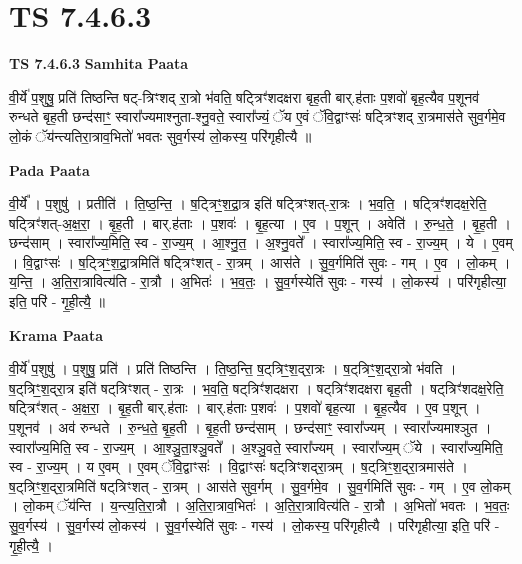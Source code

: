 \documentclass[17pt]{extarticle}
\begin{document}
\section{ TS 7.4.6.3 }

\textbf{TS 7.4.6.3 } \newline
\textbf{Samhita Paata} \newline

वी॒र्ये॑ प॒शुषु॒ प्रति॑ तिष्ठन्ति षट्-त्रिꣳशद् रा॒त्रो भ॑वति॒ षट्त्रिꣳ॑शदक्षरा बृह॒ती बार्.ह॑ताः प॒शवो॑ बृह॒त्यैव प॒शूनव॑ रुन्धते बृह॒ती छन्द॑साꣳ॒॒ स्वारा᳚ज्यमाश्नुता-श्नु॒वते॒ स्वारा᳚ज्यं॒ ॅय ए॒वं ॅवि॒द्वाꣳसः॑ षट्त्रिꣳशद् रा॒त्रमास॑ते सुव॒र्गमे॒व लो॒कं ॅय॑न्त्यतिरा॒त्राव॒भितो॑ भवतः सुव॒र्गस्य॑ लो॒कस्य॒ परि॑गृहीत्यै ॥ \newline

\textbf{Pada Paata} \newline

वी॒र्ये᳚ । प॒शुषु॑ । प्रतीति॑ । ति॒ष्ठ॒न्ति॒ । ष॒ट्त्रिꣳ॒॒श॒द्रा॒त्र इति॑ षट्त्रिꣳशत्-रा॒त्रः । भ॒व॒ति॒ । षट्त्रिꣳ॑शदक्ष॒रेति॒ षट्त्रिꣳ॑शत्-अ॒क्ष॒रा॒ । बृ॒ह॒ती । बार्.ह॑ताः । प॒शवः॑ । बृ॒ह॒त्या । ए॒व । प॒शून् । अवेति॑ । रु॒न्ध॒ते॒ । बृ॒ह॒ती । छन्द॑साम् । स्वारा᳚ज्य॒मिति॒ स्व - रा॒ज्य॒म् । आ॒श्नु॒त॒ । अ॒श्नु॒वते᳚ । स्वारा᳚ज्य॒मिति॒ स्व - रा॒ज्य॒म् । ये । ए॒वम् । वि॒द्वाꣳसः॑ । ष॒ट्त्रिꣳ॒॒श॒द्रा॒त्रमिति॑ षट्त्रिꣳशत् - रा॒त्रम् । आस॑ते । सु॒व॒र्गमिति॑ सुवः - गम् । ए॒व । लो॒कम् । य॒न्ति॒ । अ॒ति॒रा॒त्रावित्य॑ति - रा॒त्रौ । अ॒भितः॑ । भ॒व॒तः॒ । सु॒व॒र्गस्येति॑ सुवः - गस्य॑ । लो॒कस्य॑ । परि॑गृहीत्या॒ इति॒ परि॑ - गृ॒ही॒त्यै॒ ॥  \newline


\textbf{Krama Paata} \newline

वी॒र्ये॑ प॒शुषु॑ । प॒शुषु॒ प्रति॑ । प्रति॑ तिष्ठन्ति । ति॒ष्ठ॒न्ति॒ ष॒ट्‌त्रिꣳ॒॒श॒द्‍रा॒त्रः । ष॒ट्‌त्रिꣳ॒॒श॒द्‍रा॒त्रो भ॑वति । ष॒ट्‌त्रिꣳ॒॒श॒द्‌रा॒त्र इति॑ षट्‌त्रिꣳशत् - रा॒त्रः । भ॒व॒ति॒ षट्‌त्रिꣳ॑शदक्षरा । षट्‌त्रिꣳ॑शदक्षरा बृह॒ती । षट्‌त्रिꣳ॑शदक्ष॒रेति॒ षट्त्रिꣳ॑शत् - अ॒क्ष॒रा॒ । बृ॒ह॒ती बार्.ह॑ताः । बार्.ह॑ताः प॒शवः॑ । प॒शवो॑ बृह॒त्या । बृ॒ह॒त्यैव । ए॒व प॒शून् । प॒शूनव॑ । अव॑ रुन्धते । रु॒न्ध॒ते॒ बृ॒ह॒ती । बृ॒ह॒ती छन्द॑साम् । छन्द॑साꣳ॒॒ स्वारा᳚ज्यम् । स्वारा᳚ज्यमाश्ञुत । स्वारा᳚ज्य॒मिति॒ स्व - रा॒ज्य॒म् । आ॒श्ञु॒ता॒श्ञु॒वते᳚ । अ॒श्ञु॒वते॒ स्वारा᳚ज्यम् । स्वारा᳚ज्य॒म् ॅये । स्वारा᳚ज्य॒मिति॒ स्व - रा॒ज्य॒म् । य ए॒वम् । ए॒वम् ॅवि॒द्वाꣳसः॑ । वि॒द्वाꣳसः॑ षट्‌त्रिꣳशद्‍रा॒त्रम् । ष॒ट्‌त्रिꣳ॒॒श॒द्‍रा॒त्रमास॑ते । ष॒ट्‌त्रिꣳ॒॒श॒द्‍रा॒त्रमिति॑ षट्‌त्रिꣳशत् - रा॒त्रम् । आस॑ते सुव॒र्गम् । सु॒व॒र्गमे॒व । सु॒व॒र्गमिति॑ सुवः - गम् । ए॒व लो॒कम् । लो॒कम् ॅय॑न्ति । य॒न्त्य॒ति॒रा॒त्रौ । अ॒ति॒रा॒त्राव॒भितः॑ । अ॒ति॒रा॒त्रावित्य॑ति - रा॒त्रौ । अ॒भितो॑ भवतः । भ॒व॒तः॒ सु॒व॒र्गस्य॑ । सु॒व॒र्गस्य॑ लो॒कस्य॑ । सु॒व॒र्गस्येति॑ सुवः - गस्य॑ । लो॒कस्य॒ परि॑गृहीत्यै । परि॑गृहीत्या॒ इति॒ परि॑ - गृ॒ही॒त्यै॒ । \newline
\end{document}
